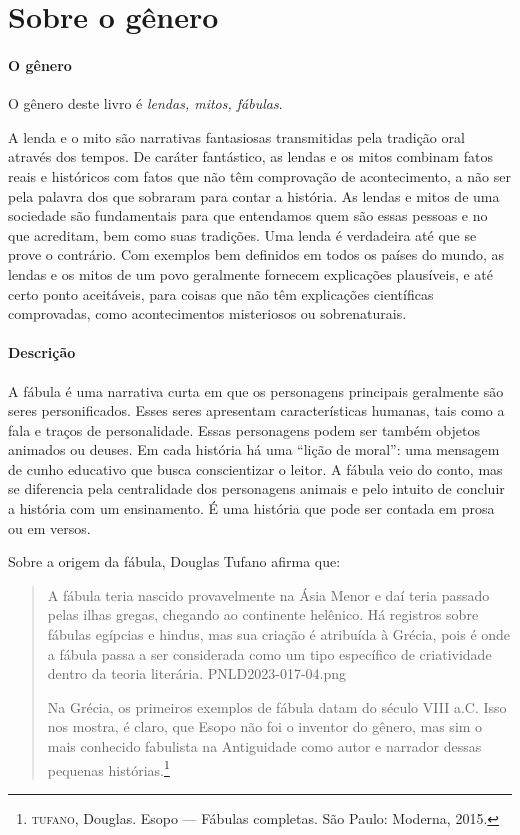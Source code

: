\documentclass[11pt]{extarticle}
\begin{document}
\section{Sobre o gênero}

\paragraph{O gênero} O gênero deste livro é \textit{lendas, mitos, fábulas}.

A lenda e o mito são narrativas fantasiosas transmitidas pela tradição oral através dos tempos. De caráter fantástico, as lendas e os mitos combinam fatos reais e históricos com fatos que não têm comprovação de acontecimento, a não ser pela palavra dos que sobraram para contar a história. As lendas e mitos de uma sociedade são fundamentais para que entendamos quem são essas pessoas e no que acreditam, bem como suas tradições. Uma lenda é verdadeira até que se prove o contrário. Com exemplos bem definidos em todos os países do mundo, as lendas e os mitos de um povo geralmente fornecem explicações plausíveis, e até certo ponto aceitáveis, para coisas que não têm explicações científicas comprovadas, como acontecimentos misteriosos ou sobrenaturais.


\paragraph{Descrição} A fábula é uma narrativa curta em que os personagens principais geralmente são seres personificados. Esses seres apresentam características humanas, tais como a fala e traços de personalidade. Essas personagens podem ser também objetos animados ou deuses. Em cada história há uma ``lição de moral'': uma mensagem de cunho educativo que busca conscientizar o leitor. A fábula veio do conto, mas se diferencia pela centralidade dos personagens animais e pelo intuito de concluir a história com um ensinamento. É uma história que pode ser contada em prosa ou em versos. 

Sobre a origem da fábula, Douglas Tufano afirma que:

\begin{quote} A fábula teria nascido provavelmente na Ásia Menor e daí teria passado pelas ilhas gregas, chegando ao continente helênico. Há registros sobre fábulas egípcias e hindus, mas sua criação é atribuída à Grécia, pois é onde a fábula passa a ser considerada como um tipo específico de criatividade dentro da teoria literária. 
 {PNLD2023-017-04.png}

Na Grécia, os primeiros exemplos de fábula datam do século VIII a.C. Isso nos mostra, é claro, que Esopo não foi o inventor do gênero, mas sim o mais conhecido fabulista na Antiguidade como autor e narrador dessas pequenas histórias.\footnote{\textsc{tufano}, Douglas. Esopo --- Fábulas completas. São Paulo: Moderna, 2015.}
\end{quote}
\end{document}
